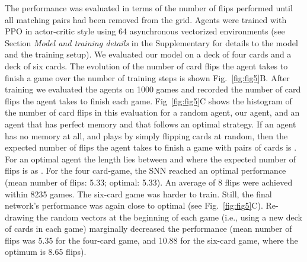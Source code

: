 \documentclass{article}
\begin{document}
The performance was evaluated in terms of the number of flips performed until all matching pairs had been removed from the grid. Agents were trained with \gls{PPO} \cite{schulman2017proximal} in actor-critic style using \num{64} asynchronous vectorized environments (see Section \emph{Model and training details} in the Supplementary for details to the model and the training setup). We evaluated our model on a deck of four cards and a deck of six cards. The evolution of the number of card flips the agent takes to finish a game over the number of training steps is shown Fig.~\ref{fig:fig5}B. After training we evaluated the agents on \num{1000} games and recorded the number of card flips the agent takes to finish each game. Fig~\ref{fig:fig5}C shows the histogram of the number of card flips in this evaluation for a random agent, our agent, and an agent that has perfect memory and that follows an optimal strategy. If an agent has no memory at all, and plays by simply flipping cards at random, then the expected number of flips the agent takes to finish a game with  pairs of cards is . For an optimal agent the length lies between  and  where the expected number of flips is  as  \cite{velleman2013expect}. For the four card-game, the SNN reached an optimal performance (mean number of flips: \num{5.33}; optimal: \num{5.33}). An average of \num{8} flips were achieved within \num{8235} games. The six-card game was harder to train. Still, the final network's performance was again close to optimal (see Fig.~\ref{fig:fig5}C). Re-drawing the random vectors at the beginning of each game (i.e., using a new deck of cards in each game) marginally decreased the performance (mean number of flips was \num{5.35} for the four-card game, and \num{10.88} for the six-card game, where the optimum is \num{8.65} flips).
\end{document}
